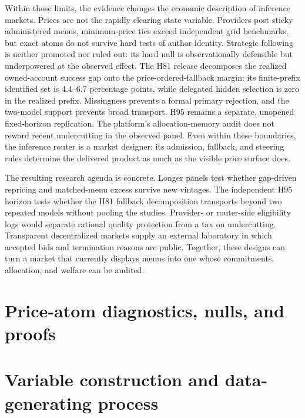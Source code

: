 \documentclass[11pt]{article}
\newcommand{\1}{\mathbf{1}}
\begin{document}
Within those limits, the evidence changes the economic description of inference
markets.  Prices are not the rapidly clearing state variable.  Providers post
sticky administered menus, minimum-price ties exceed independent grid benchmarks,
but exact atoms do not survive hard tests of author identity.  Strategic following
is neither promoted nor ruled out: its hard null is observationally defensible but
underpowered at the observed effect.  The H81 release decomposes the realized
owned-account success gap onto the price-ordered-fallback margin: its finite-prefix
identified set is 4.4--6.7 percentage points, while delegated hidden selection is
zero in the realized prefix.  Missingness prevents a formal primary rejection,
and the two-model support prevents broad transport.  H95 remains a separate,
unopened fixed-horizon replication.  The platform's allocation-memory audit does
not reward recent undercutting in the observed panel.  Even within these
boundaries, the inference
router is a market designer: its admission, fallback, and steering rules determine
the delivered product as much as the visible price surface does.

The resulting research agenda is concrete.  Longer panels test whether gap-driven
repricing and matched-menu excess survive new vintages.  The independent H95
horizon tests whether the H81 fallback decomposition transports beyond two
repeated models without pooling the studies.  Provider- or
router-side eligibility logs would separate rational quality protection from a
tax on undercutting.  Transparent decentralized markets supply an external
laboratory in which accepted bids and termination reasons are public.  Together,
these designs can turn a market that currently displays menus into one whose
commitments, allocation, and welfare can be audited.




\appendix

\section{Price-atom diagnostics, nulls, and proofs}
\label{app:price-atoms}
\PriceAtomAppendix

\section{Variable construction and data-generating process}
\label{app:variables}
\end{document}

